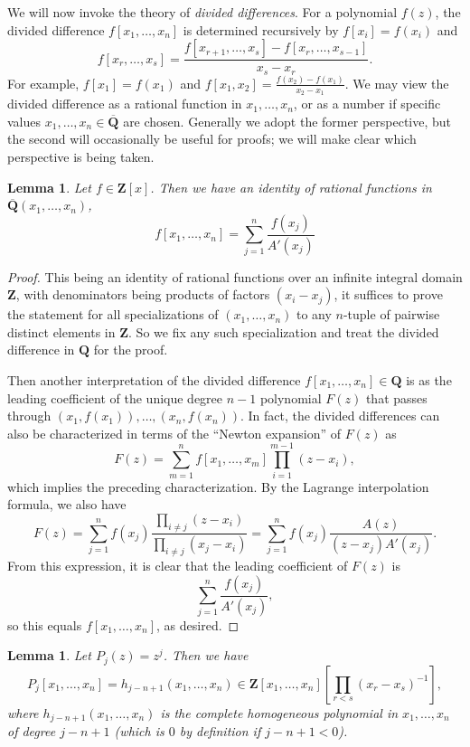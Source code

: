\documentclass[reqno]{amsart}
\numberwithin{equation}{subsection}
\newtheorem{lemma}[subsubsection]{Lemma}
\theoremstyle{definition}
\newcommand{\Z}{\mathbf{Z}}
\newcommand{\Q}{\mathbf{Q}}
\newcommand{\ol}[1]{\overline{#1}}
\begin{document}
We will now invoke the theory of \emph{divided differences}. For a polynomial $f(z)$, the divided difference $f[x_1, \ldots, x_n]$ is determined recursively by $f[x_i] = f(x_i)$ and 
\[
f[x_r, \ldots, x_s] = \frac{f[x_{r+1}, \ldots, x_s] - f[x_r, \ldots, x_{s-1}]}{x_s - x_r}.
\]
For example, $f[x_1] = f(x_1)$ and $f[x_1, x_2] = \frac{f(x_2)-f(x_1)}{x_2-x_1}$. We may view the divided difference as a rational function in $x_1,\ldots, x_n$, or as a number if specific values $x_1, \ldots, x_n \in \ol \Q$ are chosen. Generally we adopt the former perspective, but the second will occasionally be useful for proofs; we will make clear which perspective is being taken. 	 

\begin{lemma}\label{lem:leading-divided-difference}
Let $f \in \Z[x]$. Then we have an identity of rational functions in $\ol \Q(x_1, \ldots, x_n)$,
\[
f[x_1, \ldots, x_n] = \sum_{j=1}^n \frac{f(x_j)}{A'(x_j)}
\]
\end{lemma}

\begin{proof}This being an identity of rational functions over an infinite integral domain $\Z$, with denominators being products of factors $(x_i-x_j)$, it suffices to prove the statement for all specializations of $(x_1, \ldots, x_n)$ to any $n$-tuple of pairwise distinct elements in $\Z$. So we fix any such specialization and treat the divided difference in $\Q$ for the proof. 
 
Then another interpretation of the divided difference $f[x_1, \ldots, x_n] \in \Q$ is as the leading coefficient of the unique degree $n-1$ polynomial $F(z)$ that passes through $(x_1, f(x_1)), \ldots, (x_n, f(x_n))$. In fact, the divided differences can also be characterized in terms of the ``Newton expansion'' of $F(z)$ as
\[
F(z) = \sum_{m=1}^n f[x_1, \ldots, x_m]  \prod_{i=1}^{m-1} (z-x_i),
\]
which implies the preceding characterization. By the Lagrange interpolation formula, we also have
\[
F(z) = \sum_{j=1}^n f(x_j) \frac{\prod_{i \neq j} (z-x_i)}{\prod_{i \neq j} (x_j-x_i)} = \sum_{j=1}^n f(x_j) \frac{A(z)}{(z-x_j)A'(x_j)}.
\]
From this expression, it is clear that the leading coefficient of $F(z)$ is
\[
\sum_{j=1}^n \frac{f(x_j)}{A'(x_j)},
\]
so this equals $f[x_1, \ldots, x_n]$, as desired. 
\end{proof}

\begin{lemma}\label{lem:complete-homogeneous} Let $P_j(z) = z^j$. Then we have 
\[
P_j[x_1, \ldots, x_n]  = h_{j-n+1}(x_1, \ldots, x_n) \in \Z[x_1, \ldots, x_n][\prod_{r <s } (x_r-x_s)^{-1}],
\]
where $h_{j-n+1}(x_1, \ldots, x_n)$ is the complete homogeneous polynomial in $x_1, \ldots, x_n$ of degree $j-n+1$ (which is $0$ by definition if $j-n+1<0$). 
\end{lemma}
\end{document}
